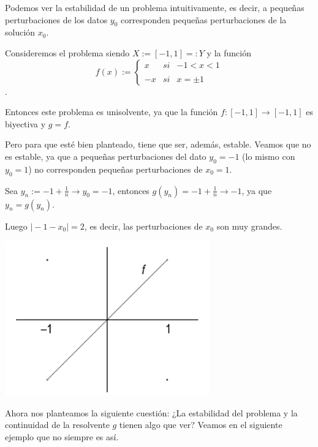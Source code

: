 Podemos ver la estabilidad de un problema intuitivamente, es decir, a pequeñas perturbaciones de los datos $y_0$ corresponden pequeñas perturbaciones de la solución $x_0$.

\begin{ejemplo}
Consideremos el problema siendo $X := [-1,1] =: Y$ y la función
$$
f(x) := \left\{ \begin{array}{lcc}
x & si & -1 < x < 1 \\
\\ -x & si & x = \pm 1
\end{array}
\right.
$$.

Entonces este problema es unisolvente, ya que la función $f :  [-1,1] \rightarrow [-1,1]$ es biyectiva y $g = f$.

Pero para que esté bien planteado, tiene que ser, además, estable. Veamos que no es estable, ya que a pequeñas perturbaciones del dato $y_0 = -1$ (lo mismo con $y_0 = 1$) no corresponden pequeñas perturbaciones de $x_0 = 1$.

Sea $y_n := -1 + \frac{1}{n} \rightarrow y_0 = -1$, entonces $g(y_n) = -1 + \frac{1}{n} \rightarrow -1$, ya que $y_n = g(y_n)$.

Luego $\vert -1 - x_0 \vert = 2$, es decir, las perturbaciones de $x_0$ son muy grandes.

\includegraphics[scale=0.4]{media/ej1-5.png}

\end{ejemplo}

Ahora nos planteamos la siguiente cuestión: ¿La estabilidad del problema y la continuidad de la resolvente $g$ tienen algo que ver? Veamos en el siguiente ejemplo que no siempre es así.

